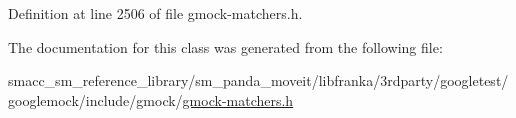 Definition at line 2506 of file gmock-\/matchers.\+h.



The documentation for this class was generated from the following file\+:\begin{DoxyCompactItemize}
\item 
smacc\+\_\+sm\+\_\+reference\+\_\+library/sm\+\_\+panda\+\_\+moveit/libfranka/3rdparty/googletest/googlemock/include/gmock/\hyperlink{gmock-matchers_8h}{gmock-\/matchers.\+h}\end{DoxyCompactItemize}
